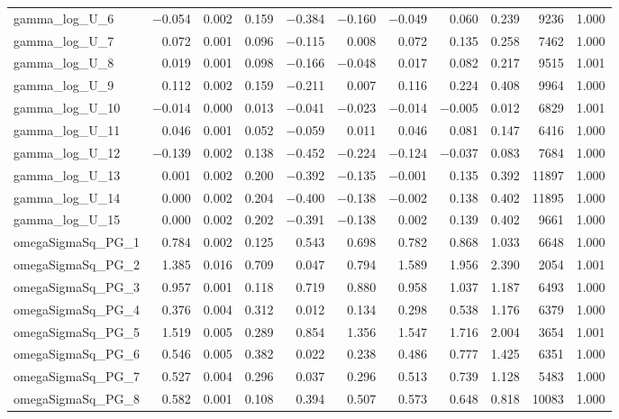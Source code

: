 \documentclass[12pt]{article}
\begin{document}
\begin{longtable}{lrrrrrrrrrr}
gamma\_log\_U\_6  & $-$0.054 & 0.002 & 0.159 & $-$0.384 & $-$0.160 & $-$0.049 &  0.060 &  0.239 &  9236 & 1.000 \\
gamma\_log\_U\_7  &  0.072 & 0.001 & 0.096 & $-$0.115 &  0.008 &  0.072 &  0.135 &  0.258 &  7462 & 1.000 \\
gamma\_log\_U\_8  &  0.019 & 0.001 & 0.098 & $-$0.166 & $-$0.048 &  0.017 &  0.082 &  0.217 &  9515 & 1.001 \\
gamma\_log\_U\_9  &  0.112 & 0.002 & 0.159 & $-$0.211 &  0.007 &  0.116 &  0.224 &  0.408 &  9964 & 1.000 \\
gamma\_log\_U\_10 & $-$0.014 & 0.000 & 0.013 & $-$0.041 & $-$0.023 & $-$0.014 & $-$0.005 &  0.012 &  6829 & 1.001 \\
gamma\_log\_U\_11 &  0.046 & 0.001 & 0.052 & $-$0.059 &  0.011 &  0.046 &  0.081 &  0.147 &  6416 & 1.000 \\
gamma\_log\_U\_12 & $-$0.139 & 0.002 & 0.138 & $-$0.452 & $-$0.224 & $-$0.124 & $-$0.037 &  0.083 &  7684 & 1.000 \\
gamma\_log\_U\_13 &  0.001 & 0.002 & 0.200 & $-$0.392 & $-$0.135 & $-$0.001 &  0.135 &  0.392 & 11897 & 1.000 \\
gamma\_log\_U\_14 &  0.000 & 0.002 & 0.204 & $-$0.400 & $-$0.138 & $-$0.002 &  0.138 &  0.402 & 11895 & 1.000 \\
gamma\_log\_U\_15 &  0.000 & 0.002 & 0.202 & $-$0.391 & $-$0.138 &  0.002 &  0.139 &  0.402 &  9661 & 1.000 \\
\addlinespace
omegaSigmaSq\_PG\_1  & 0.784 & 0.002 & 0.125 & 0.543 & 0.698 & 0.782 & 0.868 & 1.033 &  6648 & 1.000 \\
omegaSigmaSq\_PG\_2  & 1.385 & 0.016 & 0.709 & 0.047 & 0.794 & 1.589 & 1.956 & 2.390 &  2054 & 1.001 \\
omegaSigmaSq\_PG\_3  & 0.957 & 0.001 & 0.118 & 0.719 & 0.880 & 0.958 & 1.037 & 1.187 &  6493 & 1.000 \\
omegaSigmaSq\_PG\_4  & 0.376 & 0.004 & 0.312 & 0.012 & 0.134 & 0.298 & 0.538 & 1.176 &  6379 & 1.000 \\
omegaSigmaSq\_PG\_5  & 1.519 & 0.005 & 0.289 & 0.854 & 1.356 & 1.547 & 1.716 & 2.004 &  3654 & 1.001 \\
omegaSigmaSq\_PG\_6  & 0.546 & 0.005 & 0.382 & 0.022 & 0.238 & 0.486 & 0.777 & 1.425 &  6351 & 1.000 \\
omegaSigmaSq\_PG\_7  & 0.527 & 0.004 & 0.296 & 0.037 & 0.296 & 0.513 & 0.739 & 1.128 &  5483 & 1.000 \\
omegaSigmaSq\_PG\_8  & 0.582 & 0.001 & 0.108 & 0.394 & 0.507 & 0.573 & 0.648 & 0.818 & 10083 & 1.000 \\

\end{longtable}
\end{document}

